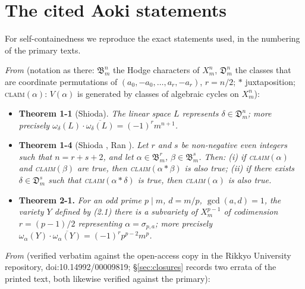 \documentclass[11pt]{amsart}
\theoremstyle{remark}
\newcommand{\V}{V}
\begin{document}
\section{The cited Aoki statements}\label{app:aoki}

For self-containedness we reproduce the exact statements used, in the numbering of the primary
texts.

\emph{From \cite{Aoki87}} (notation as there: $\mathfrak B^n_m$ the Hodge characters of $X^n_m$,
$\mathfrak D^n_m$ the classes that are coordinate permutations of $(a_0,-a_0,\dots,a_r,-a_r)$,
$r=n/2$; $*$ juxtaposition; \textsc{claim}$(\alpha)$: $\V(\alpha)$ is generated by classes of
algebraic cycles on $X^n_m$):

\begin{itemize}
\item[--] \textbf{Theorem 1-1} (Shioda). \emph{The linear space $L$ represents
$\delta\in\mathfrak D^n_m$; more precisely
$\omega_\delta(L)\cdot\overline{\omega_\delta(L)}=(-1)^r m^{n+1}$.}
\item[--] \textbf{Theorem 1-4} (Shioda \cite{Shioda79}, Ran \cite{Ran}). \emph{Let $r$ and $s$ be non-negative even integers
such that $n=r+s+2$, and let $\alpha\in\mathfrak B^r_m$, $\beta\in\mathfrak B^s_m$. Then:
(i) if \textsc{claim}$(\alpha)$ and \textsc{claim}$(\beta)$ are true, then
\textsc{claim}$(\alpha*\beta)$ is also true; (ii) if there exists $\delta\in\mathfrak D^s_m$ such
that \textsc{claim}$(\alpha*\delta)$ is true, then \textsc{claim}$(\alpha)$ is also true.}
\item[--] \textbf{Theorem 2-1.} \emph{For an odd prime $p\mid m$, $d=m/p$, $\gcd(a,d)=1$, the
variety $Y$ defined by (2.1) there is a subvariety of $X^{p-1}_m$ of codimension $r=(p-1)/2$
representing $\alpha=\sigma_{p,a}$; more precisely
$\omega_\alpha(Y)\cdot\overline{\omega_\alpha(Y)}=(-1)^r p^{p-2}m^p$.}
\end{itemize}

\emph{From \cite{Aoki00}} (verified verbatim against the open-access copy in the Rikkyo
University repository, doi:10.14992/00009819; \S\ref{sec:closures} records two errata of the
printed text, both likewise verified against the primary):
\end{document}
